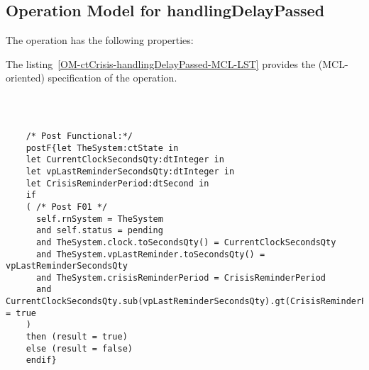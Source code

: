\subsection{Operation Model for handlingDelayPassed}

\label{OM-handlingDelayPassed}


The  operation has the following properties:

	\begin{operationmodel}



		


	\end{operationmodel}



	\vspace{1cm}
	The listing~\ref{OM-ctCrisis-handlingDelayPassed-MCL-LST} provides the \msrmessir (MCL-oriented) specification of the operation.
	
	\scriptsize
	\vspace{0.5cm}
	\begin{lstlisting}[style=MessirStyle,firstnumber=auto,captionpos=b,caption={\msrmessir (MCL-oriented) specification of the operation \emph{handlingDelayPassed}.},label=OM-ctCrisis-handlingDelayPassed-MCL-LST]

	
	
	/* Post Functional:*/ 
	postF{let TheSystem:ctState in
	let CurrentClockSecondsQty:dtInteger in
	let vpLastReminderSecondsQty:dtInteger in
	let CrisisReminderPeriod:dtSecond in
	if 
	( /* Post F01 */
	  self.rnSystem = TheSystem
	  and self.status = pending
	  and TheSystem.clock.toSecondsQty() = CurrentClockSecondsQty
	  and TheSystem.vpLastReminder.toSecondsQty() = vpLastReminderSecondsQty
	  and TheSystem.crisisReminderPeriod = CrisisReminderPeriod
	  and CurrentClockSecondsQty.sub(vpLastReminderSecondsQty).gt(CrisisReminderPeriod) = true
	)
	then (result = true)
	else (result = false)
	endif}
	
	
	\end{lstlisting}
	\normalsize 
	
	
	
	





